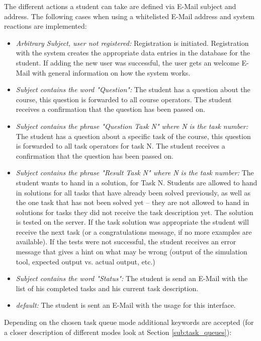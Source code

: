 The different actions a student can take are defined via E-Mail subject and address. The 
following cases when using a whitelisted E-Mail address and system reactions are implemented:
\begin{itemize}
\item \textit{Arbitrary Subject, user not registered:} Registration is initiated. Registration with the 
	system creates the appropriate data entries in the database for the student. If adding the new user was 
	successful, the user gets an welcome E-Mail with general information on how the system works.
\item \textit{Subject contains the word "Question":} The student has a question about the course, this 
	question is forwarded to all course operators. The student receives a confirmation that the 
    question has been passed on.
\item \textit{Subject contains the phrase "Question Task N" where N is the task number:} The student 
    has a question about a specific task of the course, this question is forwarded to all task operators 
	for task N. The student receives a confirmation that the question has been passed on.
\item \textit{Subject contains the phrase "Result Task N" where N is the task number:} The student wants 
    to hand in a solution, for Task N. Students are allowed to hand in solutions for all tasks that 
    have already been solved previously, as well as the one task that has not been solved yet -- they
    are not allowed to hand in solutions for tasks they did not receive the task description yet. The
    solution is tested on the server. If the task solution was appropriate the student will receive the
    next task (or a congratulations message, if no more examples are available). If the tests were not
    successful, the student receives an error message that gives a hint on what may be wrong (output of the
    simulation tool, expected output vs. actual output, etc.)
\item \textit{Subject contains the word "Status":} The student is send an E-Mail with the list of
    his completed tasks and his current task description.
\item \textit{\textit{default:}} The student is sent an E-Mail with the usage for this interface.
\end{itemize}

\newpage 

Depending on the chosen task queue mode additional keywords are accepted (for a closer description of different modes 
look at Section \ref{sub:task_queues}):

